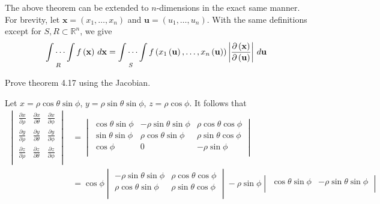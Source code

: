 The above theorem can be extended to \(n\)-dimensions in the exact same manner. For brevity, let \(\mathbf{x} = \left( x_1,\ldots,x_n \right) \) and \(\mathbf{u} =\left( u_1,\ldots,u_n \right) \). With the same definitions except for \(S,R \subset \mathbb{R} ^n\), we give
\[
    \idotsint\limits_{R}f \left( \mathbf{x}  \right) \,d \mathbf{x}  = \idotsint\limits_{S} f \left( x_1 \left( \mathbf{u}  \right),\ldots,x_n \left( \mathbf{u}   \right)   \right) \left\vert \frac{\partial \left(\mathbf{x}  \right) }{\partial \left( \mathbf{u}  \right) } \right\vert \,d \mathbf{u} 
\]
\begin{exercise}
    Prove theorem 4.17 using the Jacobian.
\end{exercise}
\begin{solution}
    Let \(x= \rho \cos \theta \sin \phi \), \(y=\rho \sin \theta \sin \phi \), \(z=\rho \cos \phi \). It follows that
    \begin{align*}
        \begin{vmatrix}
            \frac{\partial x}{\partial \rho }  &\frac{\partial x}{\partial \theta }   &\frac{\partial x}{\partial \phi }    \\[10pt]
             \frac{\partial y}{\partial \rho } &\frac{\partial y}{\partial \theta }   &\frac{\partial y}{\partial \phi }    \\[10pt]
             \frac{\partial z}{\partial \rho } &\frac{\partial z}{\partial \theta }   &\frac{\partial z}{\partial \phi }    \\
        \end{vmatrix}&=\begin{vmatrix}
             \cos \theta \sin \phi &-\rho \sin \theta \sin \phi   &\rho \cos \theta \cos \phi    \\
             \sin \theta \sin \phi &\rho \cos \theta \sin \phi   &\rho \sin \theta \cos \phi    \\
             \cos \phi &0  &-\rho \sin \phi    \\
        \end{vmatrix}\\
        &= \cos \phi \begin{vmatrix}
            -\rho \sin \theta \sin \phi & \rho \cos \theta \cos \phi  \\
            \rho \cos \theta \sin \phi &  \rho \sin \theta \cos \phi \\
        \end{vmatrix} - \rho \sin \phi \begin{vmatrix}
            \cos \theta \sin \phi & -\rho \sin \theta \sin \phi  \\

\end{vmatrix}
\end{align*}
\end{solution}
